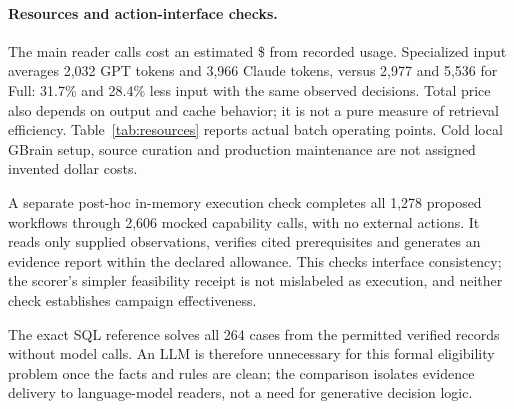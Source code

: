 \paragraph{Resources and action-interface checks.}
The main reader calls cost an estimated \$\MainCost{} from recorded usage. Specialized input averages 2,032 GPT tokens and 3,966 Claude tokens, versus 2,977 and 5,536 for Full: 31.7\% and 28.4\% less input with the same observed decisions. Total price also depends on output and cache behavior; it is not a pure measure of retrieval efficiency. Table~\ref{tab:resources} reports actual batch operating points. Cold local GBrain setup, source curation and production maintenance are not assigned invented dollar costs.

A separate post-hoc in-memory execution check completes all 1,278 proposed workflows through 2,606 mocked capability calls, with no external actions. It reads only supplied observations, verifies cited prerequisites and generates an evidence report within the declared allowance. This checks interface consistency; the scorer's simpler feasibility receipt is not mislabeled as execution, and neither check establishes campaign effectiveness.

The exact SQL reference solves all 264 cases from the permitted verified records without model calls. An LLM is therefore unnecessary for this formal eligibility problem once the facts and rules are clean; the comparison isolates evidence delivery to language-model readers, not a need for generative decision logic.
